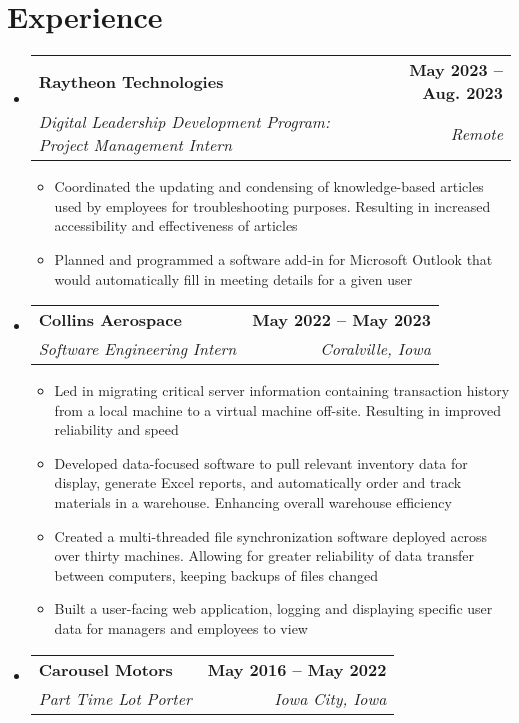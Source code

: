 \documentclass[letterpaper,11pt]{article}
\makeatletter
\newcommand{\resumeItem}[1]{
  \item\small{
    {#1 \vspace{-2pt}}
  }
}
\newcommand{\resumeSubheading}[4]{
  \vspace{-2pt}\item
    \begin{tabular*}{1.0\textwidth}[t]{l@{\extracolsep{\fill}}r}
      \textbf{#1} & \textbf{\small #2} \\
      \textit{\small#3} & \textit{\small #4} \\
    \end{tabular*}\vspace{-7pt}
}
\newcommand{\resumeSubHeadingListStart}{\begin{itemize}[leftmargin=0.0in, label={}]}
\newcommand{\resumeSubHeadingListEnd}{\end{itemize}}
\newcommand{\resumeItemListStart}{\begin{itemize}}
\newcommand{\resumeItemListEnd}{\end{itemize}\vspace{-5pt}}
\makeatother
\begin{document}
\section{Experience}
  \resumeSubHeadingListStart
  \resumeSubheading
      {Raytheon Technologies}{May 2023 -- Aug. 2023}
      {Digital Leadership Development Program: Project Management Intern}{Remote}
      \resumeItemListStart
        \resumeItem{Coordinated the updating and condensing of knowledge-based articles used by employees for troubleshooting purposes. Resulting in increased accessibility and effectiveness of articles}
        \resumeItem{Planned and programmed a software add-in for Microsoft Outlook that would automatically fill in meeting details for a given user}
        \resumeItemListEnd
        \vspace{4pt}
    \resumeSubheading
      {Collins Aerospace}{May 2022 -- May 2023}
      {Software Engineering Intern}{Coralville, Iowa}
      \resumeItemListStart
        \resumeItem{Led in migrating critical server information containing transaction history from a local machine to a virtual machine off-site. Resulting in improved reliability and speed}
        \resumeItem{Developed data-focused software to pull relevant inventory data for display, generate Excel reports, and automatically order and track materials in a warehouse. Enhancing overall warehouse efficiency}
        \resumeItem{Created a multi-threaded file synchronization software deployed across over thirty machines. Allowing for greater reliability of data transfer between computers, keeping backups of files changed}
        \resumeItem{Built a user-facing web application, logging and displaying specific user data for managers and employees to view}        
        \resumeItemListEnd
        \vspace{4pt}
    \resumeSubheading
      {Carousel Motors}{May 2016 -- May 2022}
      {Part Time Lot Porter}{Iowa City, Iowa}
    \vspace{4pt}
  \resumeSubHeadingListEnd




\end{document}
